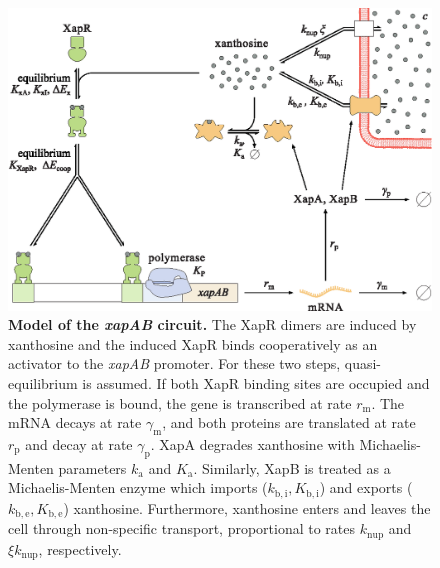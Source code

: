 \documentclass[10pt,letterpaper]{article}
\newcommand{\n}[1]{\mathrm{#1}}
\begin{document}
	\begin{figure}[h!]
		\centering
		\includegraphics{media/XapSystem.eps}
		\caption{{\bf Model of the \emph{xapAB} circuit.}
			The XapR dimers are induced by xanthosine and the induced XapR binds
			cooperatively as an activator to the \emph{xapAB} promoter. For
			these two steps, quasi-equilibrium is assumed. If both XapR binding
			sites are occupied and the polymerase is bound, the gene is
			transcribed at rate $r_{\n{m}}$. The mRNA decays at rate
			$\gamma_{\n{m}}$, and both proteins are translated at rate
			$r_{\n{p}}$ and decay at rate $\gamma_{\n{p}}$. XapA degrades
			xanthosine with Michaelis-Menten parameters $k_{\n{a}}$ and $K_{\n{a}}$.
			Similarly, XapB is treated as a Michaelis-Menten enzyme which imports ($k_{\n{b,i}}, K_{\n{b,i}}$) and exports ($k_{\n{b,e}}, K_{\n{b,e}}$) xanthosine. Furthermore, xanthosine enters and leaves the cell
			through non-specific transport, proportional to rates $k_{\n{nup}}$ and $\xi
			k_{\n{nup}}$, respectively.}
		\label{fig2:model}
	\end{figure}
	
\end{document}

